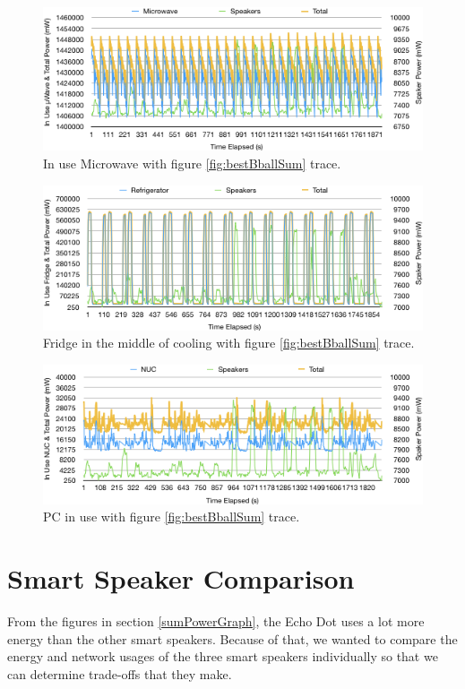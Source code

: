\begin{figure}[H]
  \centering
  \includegraphics[width=1\textwidth]{figures/uWaveInUse.png}
  \caption{In use Microwave with figure \ref{fig:bestBballSum} trace.}
  \label{fig:uWaveInUse}
\end{figure}

\begin{figure}[H]
  \centering
  \includegraphics[width=1\textwidth]{figures/fridgeInUse.png}
  \caption{Fridge in the middle of cooling with figure \ref{fig:bestBballSum} trace.}
  \label{fig:fridgeInUse}
\end{figure}

\begin{figure}[H]
  \centering
  \includegraphics[width=1\textwidth]{figures/nucInUse.png}
  \caption{PC in use with figure \ref{fig:bestBballSum} trace.}
  \label{fig:nucInUse}
\end{figure}

\section{Smart Speaker Comparison}
\label{smartSpeakerComparisonSection}
From the figures in section \ref{sumPowerGraph}, the Echo Dot uses a lot more energy than the other smart speakers. Because of that, we wanted to compare the energy and network usages of the three smart speakers individually so that we can determine trade-offs that they make.


